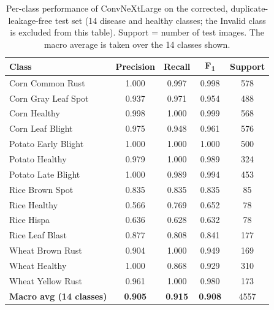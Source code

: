 \begin{table}[h!]
\centering
\caption{Per-class performance of ConvNeXtLarge on the corrected, duplicate-leakage-free test set (14 disease and healthy classes; the Invalid class is excluded from this table). Support = number of test images. The macro average is taken over the 14 classes shown.}
\label{tab:perclass}
{\small
\begin{tabular}{lcccc}
\toprule
\textbf{Class} & \textbf{Precision} & \textbf{Recall} & \textbf{F\textsubscript{1}} & \textbf{Support}\\
\midrule
Corn Common Rust & 1.000 & 0.997 & 0.998 & 578\\
Corn Gray Leaf Spot & 0.937 & 0.971 & 0.954 & 488\\
Corn Healthy & 0.998 & 1.000 & 0.999 & 568\\
Corn Leaf Blight & 0.975 & 0.948 & 0.961 & 576\\
Potato Early Blight & 1.000 & 1.000 & 1.000 & 500\\
Potato Healthy & 0.979 & 1.000 & 0.989 & 324\\
Potato Late Blight & 1.000 & 0.989 & 0.994 & 453\\
Rice Brown Spot & 0.835 & 0.835 & 0.835 & 85\\
Rice Healthy & 0.566 & 0.769 & 0.652 & 78\\
Rice Hispa & 0.636 & 0.628 & 0.632 & 78\\
Rice Leaf Blast & 0.877 & 0.808 & 0.841 & 177\\
Wheat Brown Rust & 0.904 & 1.000 & 0.949 & 169\\
Wheat Healthy & 1.000 & 0.868 & 0.929 & 310\\
Wheat Yellow Rust & 0.961 & 1.000 & 0.980 & 173\\
\midrule
\textbf{Macro avg (14 classes)} & \textbf{0.905} & \textbf{0.915} & \textbf{0.908} & 4557\\
\bottomrule
\end{tabular}
}
\end{table}
